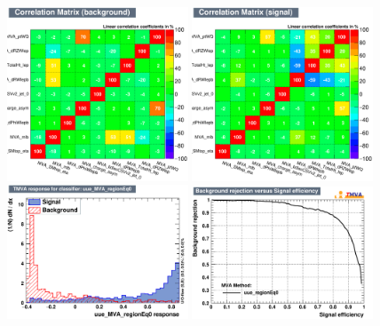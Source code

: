 \begin{figure}[htbp]
	\includegraphics[width=0.48\textwidth]{6_Search/Figures/MVAtechnics/singletopzut/uue/CorrelationMatrixB.png}
	\includegraphics[width=0.48\textwidth]{6_Search/Figures/MVAtechnics/singletopzut/uue/CorrelationMatrixS.png}
	\includegraphics[width=0.48\textwidth]{6_Search/Figures/MVAtechnics/singletopzut/uue/mva_uue_MVA_regionEq0.png}
	\includegraphics[width=0.48\textwidth]{6_Search/Figures/MVAtechnics/singletopzut/uue/rejBvsS.png}

\end{figure}
